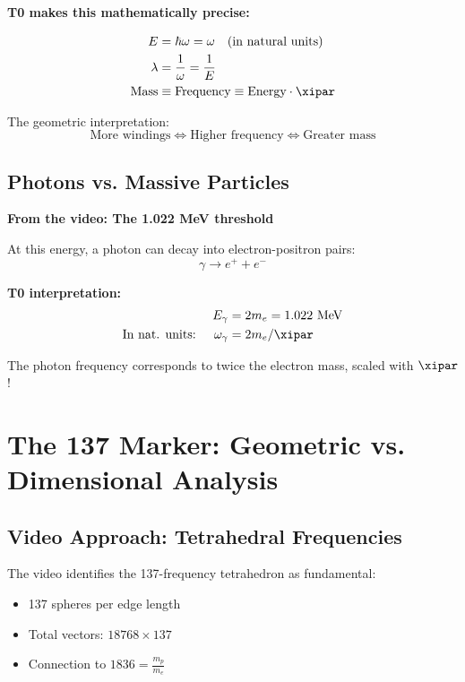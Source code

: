 	\begin{vorteil}
		\textbf{T0 makes this mathematically precise:}
		
		\begin{align}
			E &= \hbar \omega = \omega \quad \text{(in natural units)} \\
			\lambda &= \frac{1}{\omega} = \frac{1}{E} \\
			\text{Mass} &\equiv \text{Frequency} \equiv \text{Energy} \cdot \xipar
		\end{align}
		
		The geometric interpretation:
		\begin{equation}
			\boxed{\text{More windings} \Leftrightarrow \text{Higher frequency} \Leftrightarrow \text{Greater mass}}
		\end{equation}
	\end{vorteil}
	
	\subsection{Photons vs. Massive Particles}
	
	\textbf{From the video: The 1.022 MeV threshold}
	
	At this energy, a photon can decay into electron-positron pairs:
	\begin{equation}
		\gamma \rightarrow e^+ + e^-
	\end{equation}
	
	\textbf{T0 interpretation:}
	\begin{align}
		E_\gamma &= 2 m_e = 1.022 \text{ MeV} \\
		\text{In nat. units: } \quad \omega_\gamma &= 2 m_e / \xipar
	\end{align}
	
	The photon frequency corresponds to twice the electron mass, scaled with $\xipar$!
	
	\section{The 137 Marker: Geometric vs. Dimensional Analysis}
	
	\subsection{Video Approach: Tetrahedral Frequencies}
	
	The video identifies the 137-frequency tetrahedron as fundamental:
	\begin{itemize}
		\item 137 spheres per edge length
		\item Total vectors: $18768 \times 137$
		\item Connection to $1836 = \frac{m_p}{m_e}$
	\end{itemize}
	
